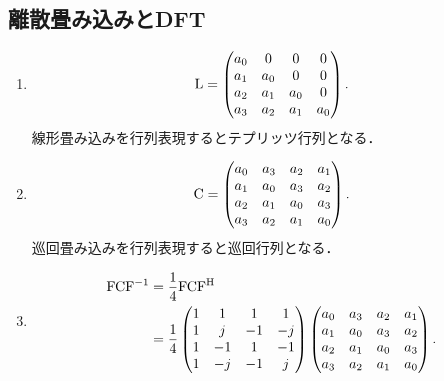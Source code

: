 \subsection{離散畳み込みとDFT}
  \begin{enumerate}[label=(\roman*)]
    \item 
      \begin{equation}
        \mathrm{L} =
          \begin{pmatrix}
            a_0 &   0 &   0 &   0 \\
            a_1 & a_0 &   0 &   0 \\
            a_2 & a_1 & a_0 &   0 \\
            a_3 & a_2 & a_1 & a_0
          \end{pmatrix}.
      \end{equation}
      線形畳み込みを行列表現するとテプリッツ行列となる．
    \item 
      \begin{equation}
        \mathrm{C} =
          \begin{pmatrix}
            a_0 & a_3 & a_2 & a_1 \\
            a_1 & a_0 & a_3 & a_2 \\
            a_2 & a_1 & a_0 & a_3 \\
            a_3 & a_2 & a_1 & a_0
          \end{pmatrix}.
      \end{equation}
      巡回畳み込みを行列表現すると巡回行列となる．
    \item 
      \begin{align}
        \matsym{F}\matsym{C}\matsym{F}^{-1} &= \frac{1}{4} \matsym{F}\matsym{C}\htp{\matsym{F}} \\
          &= 
            \frac{1}{4}
            \begin{pmatrix}
              1 &  1 &  1&  1\\
              1 &  j & -1& -j\\
              1 & -1 &  1& -1\\
              1 & -j & -1&  j
            \end{pmatrix}
            \begin{pmatrix}
              a_0 & a_3 & a_2 & a_1 \\
              a_1 & a_0 & a_3 & a_2 \\
              a_2 & a_1 & a_0 & a_3 \\
              a_3 & a_2 & a_1 & a_0
            \end{pmatrix}.

\end{align}
\end{enumerate}
